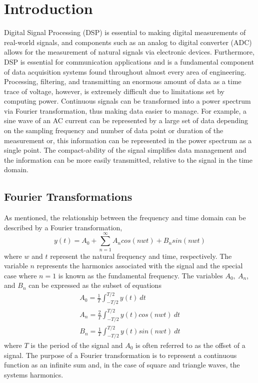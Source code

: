 \documentclass[letterpaper,12pt]{article}
\begin{document}
\section{Introduction}
Digital Signal Processing (DSP) is essential to making digital measurements of real-world signals, and components such as an analog to digital converter (ADC) allows for the measurement of natural signals via electronic devices. Furthermore, DSP is essential for communication applications and is a fundamental component of data acquisition systems found throughout almost every area of engineering. Processing, filtering, and transmitting an enormous amount of data as a time trace of voltage, however, is extremely difficult due to limitations set by computing power. Continuous signals can be transformed into a power spectrum via Fourier transformation, thus making data easier to manage. For example, a sine wave of an AC current can be represented by a large set of data depending on the sampling frequency and number of data point or duration of the measurement or, this information can be represented in the power spectrum as a single point. The compact-ability of the signal simplifies data management and the information can be more easily transmitted, relative to the signal in the time domain. 

\subsection{Fourier Transformations}
As mentioned, the relationship between the frequency and time domain can be described by a Fourier transformation,
\begin{equation}
    y(t) = A_0 + \sum_{n=1}^\infty A_ncos(nwt) + B_nsin(nwt)
    \label{FourierEq}
\end{equation}
where $w$ and $t$ represent the natural frequency and time, respectively. The variable $n$ represents the harmonics associated with the signal and the special case where $n=1$ is known as the fundamental frequency. The variables $A_0, \ A_n$, and $B_n$ can be expressed as the subset of equations
\begin{gather*}
    A_0 = \frac{1}{T} \int_{-T/2}^{T/2} y(t)\ dt \\
    A_n = \frac{2}{T} \int_{-T/2}^{T/2} y(t)cos(nwt)\ dt \\
    B_n = \frac{1}{T} \int_{-T/2}^{T/2} y(t)sin(nwt)\ dt 
\end{gather*}
where $T$ is the period of the signal and $A_0$ is often referred to as the offset of a signal. The purpose of a Fourier transformation is to represent a continuous function as an infinite sum and, in the case of square and triangle waves, the systems harmonics. 
\end{document}
